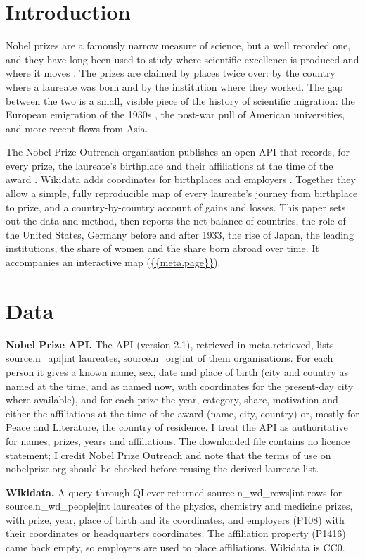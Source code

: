 \documentclass[11pt,a4paper]{article}
\begin{document}
\section{Introduction}
Nobel prizes are a famously narrow measure of science, but a well recorded one, and they have long been used to study where scientific excellence is produced and where it moves \citep{zuckerman,schlagberger}. The prizes are claimed by places twice over: by the country where a laureate was born and by the institution where they worked. The gap between the two is a small, visible piece of the history of scientific migration: the European emigration of the 1930s \citep{medawar}, the post-war pull of American universities, and more recent flows from Asia.

The Nobel Prize Outreach organisation publishes an open API that records, for every prize, the laureate's birthplace and their affiliations at the time of the award \citep{nobelapi}. Wikidata adds coordinates for birthplaces and employers \citep{wikidata}. Together they allow a simple, fully reproducible map of every laureate's journey from birthplace to prize, and a country-by-country account of gains and losses. This paper sets out the data and method, then reports the net balance of countries, the role of the United States, Germany before and after 1933, the rise of Japan, the leading institutions, the share of women and the share born abroad over time. It accompanies an interactive map (\url{{{meta.page}}}).

\section{Data}
\textbf{Nobel Prize API.} The API (version 2.1), retrieved in {{meta.retrieved}}, lists {{source.n_api|int}} laureates, {{source.n_org|int}} of them organisations. For each person it gives a known name, sex, date and place of birth (city and country as named at the time, and as named now, with coordinates for the present-day city where available), and for each prize the year, category, share, motivation and either the affiliations at the time of the award (name, city, country) or, mostly for Peace and Literature, the country of residence. I treat the API as authoritative for names, prizes, years and affiliations. The downloaded file contains no licence statement; I credit Nobel Prize Outreach and note that the terms of use on nobelprize.org should be checked before reusing the derived laureate list.

\textbf{Wikidata.} A query through QLever \citep{qlever} returned {{source.n_wd_rows|int}} rows for {{source.n_wd_people|int}} laureates of the physics, chemistry and medicine prizes, with prize, year, place of birth and its coordinates, and employers (P108) with their coordinates or headquarters coordinates. The affiliation property (P1416) came back empty, so employers are used to place affiliations. Wikidata is CC0.
\end{document}
